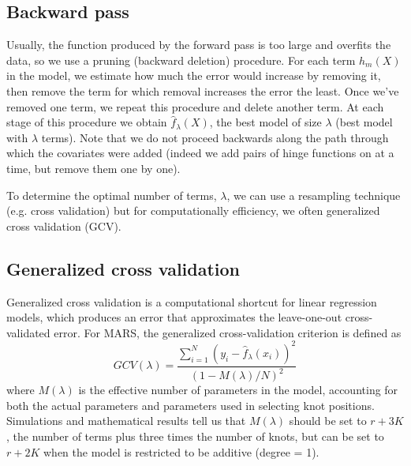 \documentclass[12pt]{article}
\begin{document}
\subsection{Backward pass} %
\label{sub:backward_pass}

Usually, the function produced by the forward pass is too large and overfits the data, so we use a pruning (backward deletion) procedure. For each term $h_{m}(X)$ in the model, we estimate how much the error would increase by removing it, then remove the term for which removal increases the error the least. Once we've removed one term, we repeat this procedure and delete another term. At each stage of this procedure we obtain $\hat{f}_{\lambda}(X)$, the best model of size $\lambda$ (best model with $\lambda$ terms). Note that we do not proceed backwards along the path through which the covariates were added (indeed we add pairs of hinge functions on at a time, but remove them one by one). 

To determine the optimal number of terms, $\lambda$, we can use a resampling technique (e.g. cross validation) but for computationally efficiency, we often generalized cross validation (GCV).


\subsection{Generalized cross validation} %
\label{sub:generalized_cross_validation}

Generalized cross validation is a computational shortcut for linear regression models, which produces an error that approximates the leave-one-out cross-validated error. For MARS, the generalized cross-validation criterion is defined as
\begin{equation}
  GCV(\lambda) = 
    \frac{
      \sum_{i = 1}^{N}(y_{i} - \hat{f}_{\lambda}(x_{i}))^2
    }{
      (1 - M(\lambda)/N)^2
    }
\end{equation}
where $M(\lambda)$ is the effective number of parameters in the model, accounting for both the actual parameters and parameters used in selecting knot positions. Simulations and mathematical results tell us that $M(\lambda)$ should be set to $r + 3K$, the number of terms plus three times the number of knots, but can be set to $r + 2K$ when the model is restricted to be additive (degree = 1).

\end{document}
